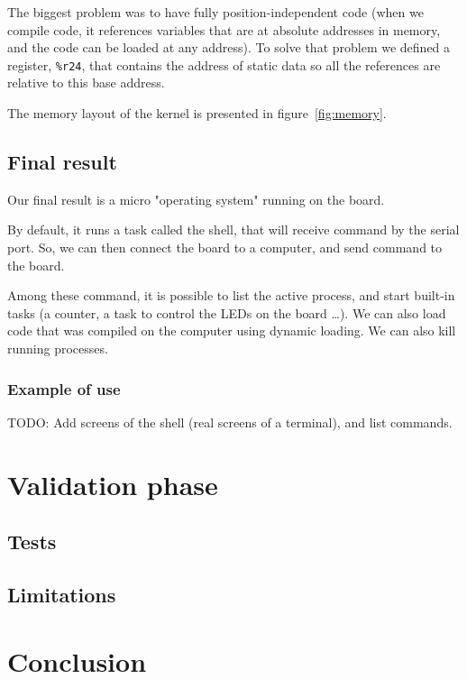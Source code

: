 \documentclass[openany, a4paper]{book}
\begin{document}
      The biggest problem was to have fully position-independent code (when
      we compile code, it references variables that are at absolute addresses
      in memory, and the code can be loaded at any address). To solve that
      problem we defined a register, \verb+%r24+, that contains the address of
      static data so all the references are relative to this base address.

      The memory layout of the kernel is presented in figure~\ref{fig:memory}.

    \section{Final result}
      Our final result is a micro "operating system" running on the board.

      By default, it runs a task called the shell, that will receive command by
      the serial port.  So, we can then connect the board to a computer, and
      send command to the board.

      Among these command, it is possible to list the active process, and start
      built-in tasks (a counter, a task to control the LEDs on the board \dots).
      We can also load code that was compiled on the computer using dynamic
      loading. We can also kill running processes.

      \subsection{Example of use}
        TODO: Add screens of the shell (real screens of a terminal), and list
        commands.

  \chapter{Validation phase}

    \section{Tests}

    \section{Limitations}

  \chapter{Conclusion}
\end{document}
